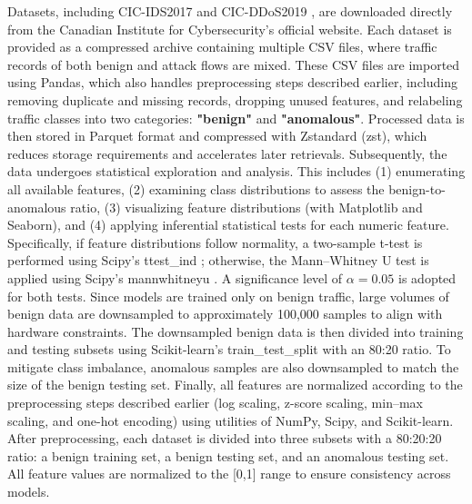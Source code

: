 Datasets, including CIC-IDS2017 \citep{cicids2017} and CIC-DDoS2019 \citep{cicddos2019}, are downloaded directly from the Canadian Institute for Cybersecurity's official website. Each dataset is provided as a compressed archive containing multiple CSV files, where traffic records of both benign and attack flows are mixed. These CSV files are imported using Pandas, which also handles preprocessing steps described earlier, including removing duplicate and missing records, dropping unused features, and relabeling traffic classes into two categories: \textbf{"benign"} and \textbf{"anomalous"}. Processed data is then stored in Parquet format and compressed with Zstandard (zst), which reduces storage requirements and accelerates later retrievals. Subsequently, the data undergoes statistical exploration and analysis. This includes (1) enumerating all available features, (2) examining class distributions to assess the benign-to-anomalous ratio, (3) visualizing feature distributions (with Matplotlib and Seaborn), and (4) applying inferential statistical tests for each numeric feature. Specifically, if feature distributions follow normality, a two-sample t-test is performed using Scipy’s ttest\_ind \citep{scipytt}; otherwise, the Mann–Whitney U test is applied using Scipy’s mannwhitneyu \citep{scipymt}. A significance level of $\alpha = 0.05$ is adopted for both tests. Since models are trained only on benign traffic, large volumes of benign data are downsampled to approximately 100,000 samples to align with hardware constraints. The downsampled benign data is then divided into training and testing subsets using Scikit-learn's train\_test\_split \citep{sklearntts} with an 80:20 ratio. To mitigate class imbalance, anomalous samples are also downsampled to match the size of the benign testing set. Finally, all features are normalized according to the preprocessing steps described earlier (log scaling, z-score scaling, min–max scaling, and one-hot encoding) using utilities of NumPy, Scipy, and Scikit-learn. After preprocessing, each dataset is divided into three subsets with a 80:20:20 ratio: a benign training set, a benign testing set, and an anomalous testing set. All feature values are normalized to the [0,1] range to ensure consistency across models.

